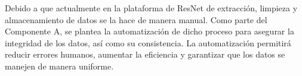 Debido a que actualmente en la plataforma de ResNet de extracción, limpieza y almacenamiento de datos se la hace de manera manual. Como parte del Componente A, se plantea la automatización de dicho proceso para asegurar la integridad de los datos, así como su consistencia. La automatización permitirá reducir errores humanos, aumentar la eficiencia y garantizar que los datos se manejen de manera uniforme.